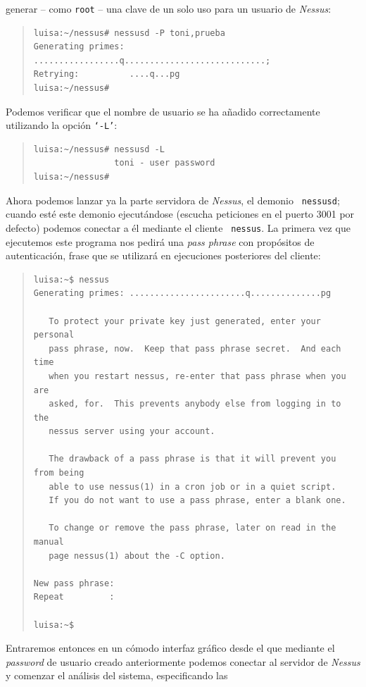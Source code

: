 generar -- como {\tt root} -- una clave de un solo uso para un usuario de {\it 
Nessus}:
\begin{quote}
\begin{verbatim}
luisa:~/nessus# nessusd -P toni,prueba
Generating primes: .................q............................;
Retrying:          ....q...pg
luisa:~/nessus# 
\end{verbatim}
\end{quote}
Podemos verificar que el nombre de usuario se ha a\~nadido correctamente
utilizando la opci\'on {\tt `-L'}:
\begin{quote}
\begin{verbatim}
luisa:~/nessus# nessusd -L
                toni - user password
luisa:~/nessus#
\end{verbatim}
\end{quote}
Ahora podemos lanzar ya la parte servidora de {\it Nessus}, el demonio {\tt
nessusd}; cuando est\'e este demonio ejecut\'andose (escucha peticiones en el
puerto 3001 por defecto) podemos conectar a \'el mediante el cliente {\tt
nessus}. La primera vez que ejecutemos este programa nos pedir\'a una {\it 
pass phrase} con prop\'ositos de autenticaci\'on, frase que se utilizar\'a en
ejecuciones posteriores del cliente:
\begin{quote}
\begin{verbatim}
luisa:~$ nessus
Generating primes: .......................q..............pg

   To protect your private key just generated, enter your personal
   pass phrase, now.  Keep that pass phrase secret.  And each time
   when you restart nessus, re-enter that pass phrase when you are
   asked, for.  This prevents anybody else from logging in to the
   nessus server using your account.

   The drawback of a pass phrase is that it will prevent you from being
   able to use nessus(1) in a cron job or in a quiet script.
   If you do not want to use a pass phrase, enter a blank one.

   To change or remove the pass phrase, later on read in the manual
   page nessus(1) about the -C option.

New pass phrase: 
Repeat         : 

luisa:~$
\end{verbatim}
\end{quote}
Entraremos entonces en un c\'omodo interfaz gr\'afico desde el que mediante
el {\it password} de usuario creado anteriormente podemos conectar al servidor
de {\it Nessus} y comenzar el an\'alisis del sistema, especificando las 
